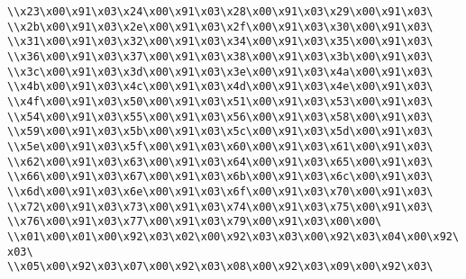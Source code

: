 \verb|\\x23\x00\x91\x03\x24\x00\x91\x03\x28\x00\x91\x03\x29\x00\x91\x03\|\newline
\verb|\\x2b\x00\x91\x03\x2e\x00\x91\x03\x2f\x00\x91\x03\x30\x00\x91\x03\|\newline
\verb|\\x31\x00\x91\x03\x32\x00\x91\x03\x34\x00\x91\x03\x35\x00\x91\x03\|\newline
\verb|\\x36\x00\x91\x03\x37\x00\x91\x03\x38\x00\x91\x03\x3b\x00\x91\x03\|\newline
\verb|\\x3c\x00\x91\x03\x3d\x00\x91\x03\x3e\x00\x91\x03\x4a\x00\x91\x03\|\newline
\verb|\\x4b\x00\x91\x03\x4c\x00\x91\x03\x4d\x00\x91\x03\x4e\x00\x91\x03\|\newline
\verb|\\x4f\x00\x91\x03\x50\x00\x91\x03\x51\x00\x91\x03\x53\x00\x91\x03\|\newline
\verb|\\x54\x00\x91\x03\x55\x00\x91\x03\x56\x00\x91\x03\x58\x00\x91\x03\|\newline
\verb|\\x59\x00\x91\x03\x5b\x00\x91\x03\x5c\x00\x91\x03\x5d\x00\x91\x03\|\newline
\verb|\\x5e\x00\x91\x03\x5f\x00\x91\x03\x60\x00\x91\x03\x61\x00\x91\x03\|\newline
\verb|\\x62\x00\x91\x03\x63\x00\x91\x03\x64\x00\x91\x03\x65\x00\x91\x03\|\newline
\verb|\\x66\x00\x91\x03\x67\x00\x91\x03\x6b\x00\x91\x03\x6c\x00\x91\x03\|\newline
\verb|\\x6d\x00\x91\x03\x6e\x00\x91\x03\x6f\x00\x91\x03\x70\x00\x91\x03\|\newline
\verb|\\x72\x00\x91\x03\x73\x00\x91\x03\x74\x00\x91\x03\x75\x00\x91\x03\|\newline
\verb|\\x76\x00\x91\x03\x77\x00\x91\x03\x79\x00\x91\x03\x00\x00\|\newline
\verb|\\x01\x00\x01\x00\x92\x03\x02\x00\x92\x03\x03\x00\x92\x03\x04\x00\x92\x03\|\newline
\verb|\\x05\x00\x92\x03\x07\x00\x92\x03\x08\x00\x92\x03\x09\x00\x92\x03\|\newline
